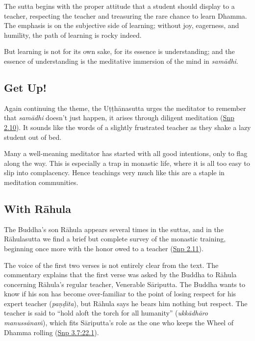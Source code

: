 \documentclass[12pt,openany]{book}%
\begin{document}
The sutta begins with the proper attitude that a student should display to a teacher, respecting the teacher and treasuring the rare chance to learn Dhamma. The emphasis is on the subjective side of learning; without joy, eagerness, and humility, the path of learning is rocky indeed.

But learning is not for its own sake, for its essence is understanding; and the essence of understanding is the meditative immersion of the mind in \textit{\textsanskrit{samādhi}}.

\subsection*{Get Up!}

Again continuing the theme, the \textsanskrit{Uṭṭhānasutta} urges the meditator to remember that \textit{\textsanskrit{samādhi}} doesn’t just happen, it arises through diligent meditation (\href{https://suttacentral.net/snp2.10/en/sujato}{Snp 2.10}). It sounds like the words of a slightly frustrated teacher as they shake a lazy student out of bed.

Many a well-meaning meditator has started with all good intentions, only to flag along the way. This is especially a trap in monastic life, where it is all too easy to slip into complacency. Hence teachings very much like this are a staple in meditation communities.

\subsection*{With \textsanskrit{Rāhula}}

The Buddha’s son \textsanskrit{Rāhula} appears several times in the suttas, and in the \textsanskrit{Rāhulasutta} we find a brief but complete survey of the monastic training, beginning once more with the honor owed to a teacher (\href{https://suttacentral.net/snp2.11/en/sujato}{Snp 2.11}).

The voice of the first two verses is not entirely clear from the text. The commentary explains that the first verse was asked by the Buddha to \textsanskrit{Rāhula} concerning \textsanskrit{Rāhula}’s regular teacher, Venerable \textsanskrit{Sāriputta}. The Buddha wants to know if his son has become over-familiar to the point of losing respect for his expert teacher (\textit{\textsanskrit{paṇḍita}}), but \textsanskrit{Rāhula} says he bears him nothing but respect. The teacher is said to “hold aloft the torch for all humanity” (\textit{\textsanskrit{ukkādhāro} \textsanskrit{manussānaṁ}}), which fits \textsanskrit{Sāriputta}’s role as the one who keeps the Wheel of Dhamma rolling (\href{https://suttacentral.net/snp3.7/en/sujato\#22.1}{Snp 3.7:22.1}).
\end{document}
